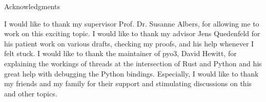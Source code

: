 \thispagestyle{empty}

\vspace*{20mm}

\begin{center}
{ Acknowledgments}
\end{center}

\vspace{10mm}

I would like to thank my supervisor Prof. Dr. Susanne Albers, for allowing me to work on this exciting topic. I would like to thank my advisor Jens Quedenfeld for his patient work on various drafts, checking my proofs, and his help whenever I felt stuck. I would like to thank the maintainer of pyo3, David Hewitt, for explaining the workings of threads at the intersection of Rust and Python and his great help with debugging the Python bindings. Especially, I would like to thank my friends and my family for their support and stimulating discussions on this and other topics.

\cleardoublepage{}

